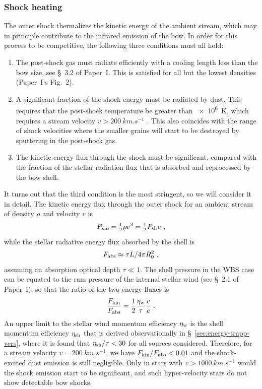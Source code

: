 \subsubsection{Shock heating}
\newcommand\kin{\ensuremath{_{\text{kin}}}}
The outer shock thermalizes the kinetic energy of the ambient stream,
which may in principle contribute to the infrared emission of the bow.
In order for this process to be competitive, the following three
conditions must all hold:
\begin{enumerate}[1.]
\item The post-shock gas must radiate efficiently with a cooling
  length less than the bow size, see \S~3.2 of Paper~I.\@
  This is satisfied for all but the lowest densities (Paper~I's
  Fig.~2).
\item A significant fraction of the shock energy must be radiated by
  dust.  This requires that the post-shock temperature be greater than
  \SI{e6}{K}, which requires a stream velocity
  \(v > \SI{200}{km.s^{-1}}\) \citep{Draine:1981a}.  This also
  coincides with the range of shock velocities where the smaller
  grains will start to be destroyed by sputtering in the post-shock
  gas.
\item The kinetic energy flux through the shock must be significant,
  compared with the fraction of the stellar radiation flux that is
  absorbed and reprocessed by the bow shell.
\end{enumerate}
It turns out that the third condition is the most stringent, so we
will consider it in detail.  The kinetic energy flux through the outer shock for an ambient stream of density \(\rho\) and velocity \(v\) is
\begin{equation}
  \label{eq:Fkin}
  F_{\text{kin}} = \tfrac12 \rho v^3 = \tfrac12 P_{\text{sh}} v \ , 
\end{equation}
while the stellar radiative energy flux absorbed by the shell is
\begin{equation}
  \label{eq:Ftrap}
  F_{\text{abs}} \approx \tau L / 4 \pi R_0^2 \ ,
\end{equation}
assuming an absorption optical depth \(\tau \ll 1\). The shell
pressure in the WBS case can be equated to the ram pressure of the
internal stellar wind (see
\S~2.1 of Paper~I), so that the ratio of the two energy fluxes is
\begin{equation}
  \label{eq:F-ratio-shock}
  \frac{F\ke}{F\trap} = \frac12 \frac{\eta\wind}{\tau} \frac{v}{c} \ .
\end{equation}
An upper limit to the stellar wind momentum efficiency \(\eta_{\text{w}}\) is
the shell momentum efficiency \(\eta_{\text{sh}}\) that is derived
observationally in \S~\ref{sec:energy-trapp-vers}, where it is found
that \(\eta_{\text{sh}} / \tau < 30\) for all sources considered.  Therefore, for
a stream velocity \(v = \SI{200}{km.s^{-1}}\), we have
\(F_{\text{kin}}/F_{\text{abs}} < 0.01\) and the shock-excited dust emission is still
negligible.  Only in stars with \(v > \SI{1000}{km.s^{-1}}\) would
the shock emission start to be significant, and such hyper-velocity
stars \citep{Brown:2015a} do not show detectable bow shocks.

